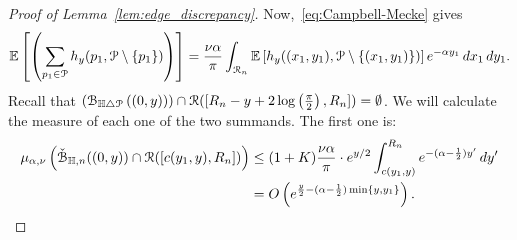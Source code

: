 \begin{proof}[Proof of Lemma~\ref{lem:edge_discrepancy}]
Now,~\eqref{eq:Campbell-Mecke} gives
\begin{align*}
\mathbb{E}\left[\left( \sum_{p_1 \in {\mathcal P}} 
		h_y (p_1, {\mathcal P} \setminus \{ p_1 \})\right)\right] 
	=\frac{\nu \alpha}{\pi} \int_{{\mathcal R}_n} \mathbb{E}\left[h_y((x_1,y_1), {\mathcal P} \setminus \{(x_1,y_1)\})\right]
		e^{-\alpha y_1} \, dx_1 \, dy_1.
\end{align*}
Recall that $({\mathcal B}_{\mathbb{H} \bigtriangleup {\mathcal P}}\left((0,y)\right))\cap {\mathcal R}([R_n - y + 2 \log\left(\frac{\pi}{2}\right),R_n]) = \emptyset$. 
We will calculate the measure of each one of the two summands. The first one is:
\begin{align*}
	\mu_{\alpha,\nu}\left( \check{{\mathcal B}}_{\mathbb{H},n}((0,y)) \cap  {\mathcal R}([c(y_1,y), R_n])\right) 
	&\leq (1+ K) \frac{\nu \alpha}{\pi} \cdot e^{y/2}  \int_{c(y_1,y)}^{R_n} e^{-(\alpha - \frac{1}{2}) y'} \, dy' \\
	&=  O\left(e^{\frac{y}{2} - (\alpha-\frac{1}{2}) \min \{y,y_1\}}\right).
\end{align*}


\end{proof}
